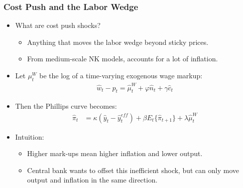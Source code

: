 \documentclass[english,xcolor=svgnames]{beamer}
\begin{document}
\begin{frame}
\frametitle{Cost Push and the Labor Wedge}
\begin{itemize}
	\item What are cost push shocks?
	\begin{itemize}
		\item Anything that moves the labor wedge beyond sticky prices.
		\item From medium-scale NK models, accounts for a lot of inflation.
	\end{itemize}
	\item Let $\mu_t^W$ be the log of a time-varying exogenous wage markup:
	\begin{align*}
		\hat{w}_t-\hat{p}_t=\hat{\mu}^W_t+\varphi \hat{n}_t+\gamma \hat{c}_t
	\end{align*}
	\item Then the Phillips curve becomes:
	\begin{align*}
		\hat{\pi}_t&=\kappa (\hat{y}_t - \hat{y}_t^{eff}) +\beta E_t \{\hat{\pi}_{t+1}\} +\lambda \hat{\mu}^W_t
	\end{align*}
	\item Intuition: 
	\begin{itemize}
		\item Higher mark-ups mean higher inflation and lower output.
		\item Central bank wants to offset this inefficient shock, but can only move output and inflation in the same direction.
	\end{itemize}
\end{itemize}
\end{frame}
\end{document}
